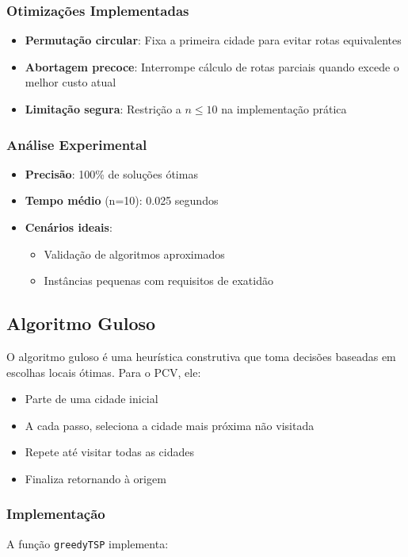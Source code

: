 \subsubsection{Otimizações Implementadas}
\begin{itemize}
\item \textbf{Permutação circular}: Fixa a primeira cidade para evitar rotas equivalentes
\item \textbf{Abortagem precoce}: Interrompe cálculo de rotas parciais quando excede o melhor custo atual
\item \textbf{Limitação segura}: Restrição a $n \leq 10$ na implementação prática
\end{itemize}

\subsubsection{Análise Experimental}
\begin{itemize}
\item \textbf{Precisão}: 100\% de soluções ótimas
\item \textbf{Tempo médio} (n=10): 0.025 segundos
\item \textbf{Cenários ideais}:
  \begin{itemize}
  \item Validação de algoritmos aproximados
  \item Instâncias pequenas com requisitos de exatidão
  \end{itemize}
\end{itemize}


\subsection{Algoritmo Guloso}

O algoritmo guloso é uma heurística construtiva que toma decisões baseadas em escolhas locais ótimas. Para o PCV, ele:

\begin{itemize}
\item Parte de uma cidade inicial
\item A cada passo, seleciona a cidade mais próxima não visitada
\item Repete até visitar todas as cidades
\item Finaliza retornando à origem
\end{itemize}

\subsubsection{Implementação}
A função \texttt{greedyTSP} implementa:

